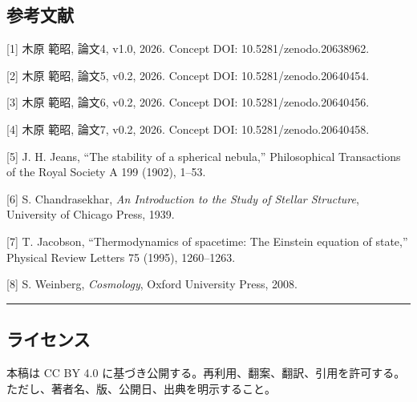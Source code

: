 \documentclass[
]{ltjsarticle}
\begin{document}
\subsection{参考文献}\label{ux53c2ux8003ux6587ux732e}

{[}1{]} 木原 範昭, 論文4, v1.0, 2026. Concept DOI:
10.5281/zenodo.20638962.

{[}2{]} 木原 範昭, 論文5, v0.2, 2026. Concept DOI:
10.5281/zenodo.20640454.

{[}3{]} 木原 範昭, 論文6, v0.2, 2026. Concept DOI:
10.5281/zenodo.20640456.

{[}4{]} 木原 範昭, 論文7, v0.2, 2026. Concept DOI:
10.5281/zenodo.20640458.

{[}5{]} J. H. Jeans, ``The stability of a spherical nebula,''
Philosophical Transactions of the Royal Society A 199 (1902), 1--53.

{[}6{]} S. Chandrasekhar, \emph{An Introduction to the Study of Stellar
Structure}, University of Chicago Press, 1939.

{[}7{]} T. Jacobson, ``Thermodynamics of spacetime: The Einstein
equation of state,'' Physical Review Letters 75 (1995), 1260--1263.

{[}8{]} S. Weinberg, \emph{Cosmology}, Oxford University Press, 2008.

\begin{center}\rule{0.5\linewidth}{0.5pt}\end{center}

\subsection{ライセンス}\label{ux30e9ux30a4ux30bbux30f3ux30b9}

本稿は CC BY 4.0
に基づき公開する。再利用、翻案、翻訳、引用を許可する。ただし、著者名、版、公開日、出典を明示すること。
\end{document}
